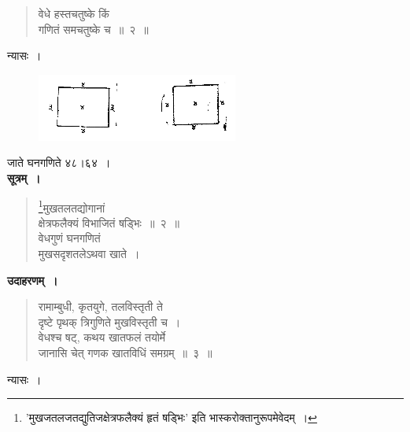 \documentclass[11pt, openany]{book}
\begin{document}
\newpage
\begin{quote}
    \bqt 
    वेधे हस्तचतुष्के किं\\
गणितं समचतुष्के च~॥~२~॥
\end{quote}

न्यासः~। 
\vspace{-2mm}

\begin{figure}[h!]
\centering
         \includegraphics[scale=0.85]{graphics/capture188.png}
         \end{figure}
\vspace{-2mm}
         
जाते घनगणिते ४८।६४~।\\

\textbf{सूत्रम्~।} 
\begin{quote}
    \bs 
    \footnote{'{\color{violet}मुखजतलजतद्युतिजक्षेत्रफलैक्यं हृतं षड्भिः}' इति {\color{violet}भास्करो}क्तानुरूपमेवेदम्~। }मुखतलतद्योगानां\\
क्षेत्रफलैक्यं विभाजितं षड्भिः~॥~२~॥~\\
वेधगुणं घनगणितं\\
मुखसदृशतलेऽथवा खाते~। 
\end{quote}

\textbf{उदाहरणम्~।} 
\begin{quote}
    \bqt 
    रामाम्बुधी, कृतयुगे, तलविस्तृती ते\\
दृष्टे पृथक् त्रिगुणिते मुखविस्तृती च~। \\
वेधश्च षट्, कथय खातफलं तयोर्मे\\
जानासि चेत् गणक खातविधिं समग्रम्~॥~३~॥
\end{quote}
\newpage%
न्यासः~। 
\vspace{-2mm}
\end{document}
